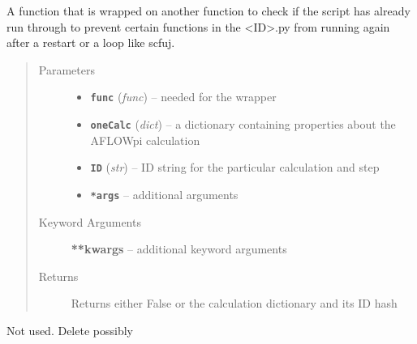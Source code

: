\documentclass[letterpaper,10pt,english]{sphinxmanual}
\begin{document}

\begin{fulllineitems}
\label{prep:prep.__check_lock}
A function that is wrapped on another function to check if the script
has already run through to prevent certain functions in the \textless{}ID\textgreater{}.py
from running again after a restart or a loop like scfuj.
\begin{quote}\begin{description}
\item[{Parameters}] \leavevmode\begin{itemize}
\item {} 
\textbf{\texttt{func}} (\emph{func}) -- needed for the wrapper

\item {} 
\textbf{\texttt{oneCalc}} (\emph{dict}) -- a dictionary containing properties about the AFLOWpi calculation

\item {} 
\textbf{\texttt{ID}} (\emph{str}) -- ID string for the particular calculation and step

\item {} 
\textbf{\texttt{*args}} -- additional arguments

\end{itemize}

\item[{Keyword Arguments}] \leavevmode
\textbf{**kwargs} --
additional keyword arguments

\item[{Returns}] \leavevmode
Returns either False or the calculation dictionary and its ID hash

\end{description}\end{quote}

\end{fulllineitems}


\begin{fulllineitems}
\label{prep:prep.__check_restart}
Not used. Delete possibly

\end{fulllineitems}
\end{document}
